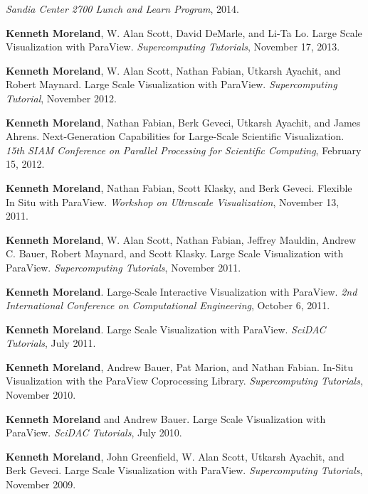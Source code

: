 \begin{enumerate}[label={[\arabic*]}, left=0pt]
  \emph{Sandia Center 2700 Lunch and Learn Program}, 2014.
\item  %
  \textbf{Kenneth Moreland}, W. Alan Scott, David DeMarle, and Li-Ta Lo.
  Large Scale Visualization with ParaView.
  \emph{Supercomputing Tutorials}, November 17, 2013.
\item  %
  \textbf{Kenneth Moreland}, W. Alan Scott, Nathan Fabian, Utkarsh Ayachit, and Robert Maynard.
  Large Scale Visualization with ParaView.
  \emph{Supercomputing Tutorial}, November 2012.
\item  %
  \textbf{Kenneth Moreland}, Nathan Fabian, Berk Geveci, Utkarsh Ayachit, and James Ahrens.
  Next-Generation Capabilities for Large-Scale Scientific Visualization.
  \emph{15th SIAM Conference on Parallel Processing for Scientific Computing}, February 15, 2012.
\item  %
  \textbf{Kenneth Moreland}, Nathan Fabian, Scott Klasky, and Berk Geveci.
  Flexible In Situ with ParaView.
  \emph{Workshop on Ultrascale Visualization}, November 13, 2011.
\item  %
  \textbf{Kenneth Moreland}, W. Alan Scott, Nathan Fabian, Jeffrey Mauldin, Andrew C. Bauer, Robert Maynard, and Scott Klasky.
  Large Scale Visualization with ParaView.
  \emph{Supercomputing Tutorials}, November 2011.
\item  %
  \textbf{Kenneth Moreland}.
  Large-Scale Interactive Visualization with ParaView.
  \emph{2nd International Conference on Computational Engineering}, October 6, 2011.
\item  %
  \textbf{Kenneth Moreland}.
  Large Scale Visualization with ParaView.
  \emph{SciDAC Tutorials}, July 2011.
\item  %
  \textbf{Kenneth Moreland}, Andrew Bauer, Pat Marion, and Nathan Fabian.
  In-Situ Visualization with the ParaView Coprocessing Library.
  \emph{Supercomputing Tutorials}, November 2010.
\item  %
  \textbf{Kenneth Moreland} and Andrew Bauer.
  Large Scale Visualization with ParaView.
  \emph{SciDAC Tutorials}, July 2010.
\item  %
  \textbf{Kenneth Moreland}, John Greenfield, W. Alan Scott, Utkarsh Ayachit, and Berk Geveci.
  Large Scale Visualization with ParaView.
  \emph{Supercomputing Tutorials}, November 2009.
\item  %

\end{enumerate}
